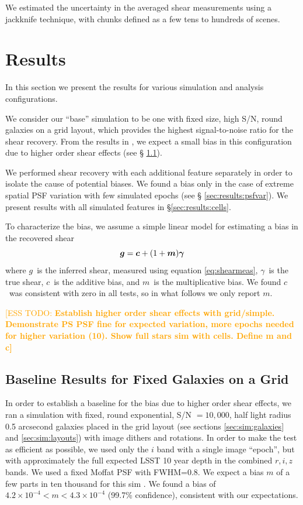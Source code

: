 \documentclass[iop, twocolappendix, appendixfloats, numberedappendix, apj]{hackemulateapj}
\newcommand{\esstodo}[1]{\textcolor{orange}{[ESS TODO: \bf #1]}}
\newcommand{\vecg}{\mbox{\boldmath $g$}}
\newcommand{\vecc}{\mbox{\boldmath $c$}}
\newcommand{\vecm}{\mbox{\boldmath $m$}}
\newcommand{\vecgam}{\mbox{\boldmath $\gamma$}}
\begin{document}
We estimated the uncertainty in the averaged shear measurements using a
jackknife technique, with chunks defined as a few tens to hundreds of scenes.

\section{Results} \label{sec:results}

In this section we present the results for various simulation and analysis
configurations.

We consider our ``base'' simulation to be one with fixed size, high S/N, round
galaxies on a grid layout, which provides the highest signal-to-noise ratio for
the shear recovery. From the results in \citet{mdet20}, we expect a small bias
in this configuration due to higher order shear effects (see \S
\ref{sec:results:base}).

We performed shear recovery with each additional feature separately in order to
isolate the cause of potential biases.  We found a bias only in the case of
extreme spatial PSF variation with few simulated epochs (see \S
\ref{sec:results:psfvar}).  We present results with all simulated features in
\S \ref{sec:results:cells}.

To characterize the bias, we assume a simple linear model \citep[see,
e.g.,][]{heymans2006} for estimating a bias in the recovered shear
\begin{equation} \label{eq:m}
\vecg = \vecc + (1 + \vecm) \vecgam
\end{equation}
where \vecg\ is the inferred shear, measured using equation \ref{eq:shearmeas},
\vecgam\ is the true shear, \vecc\ is the additive bias, and \vecm\ is the
multiplicative bias. We found \vecc\ was consistent with zero in all tests, so
in what follows we only report \vecm.

\esstodo{Establish higher order shear effects with grid/simple.  Demonstrate PS
PSF fine for expected variation, more epochs needed for higher variation (10).
Show full stars sim with cells.  Define m and c}

\subsection{Baseline Results for Fixed Galaxies on a Grid} \label{sec:results:base}

In order to establish a baseline for the bias due to higher order shear
effects, we ran a simulation with fixed, round exponential, S/N $= 10,000$,
half light radius 0.5 arcsecond galaxies placed in the grid layout (see
sections \ref{sec:sim:galaxies} and \ref{sec:sim:layouts}) with image dithers
and rotations.  In order to make the test as efficient as possible, we used
only the $i$ band with a single image ``epoch'', but with approximately the
full expected LSST 10 year depth in the combined $r, i, z$ bands.  We used a
fixed Moffat PSF\citep{Moffat1969} with FWHM=0.8.  We expect a bias $m$ of a
few parts in ten thousand for this sim \citep{SheldonMcal2017}.  We found a
bias of $4.2\times 10^{-4} < m < 4.3\times 10^{-4}$ (99.7\% confidence),
consistent with our expectations. 
\end{document}
